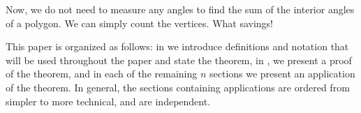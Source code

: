 Now, we do not need to measure any angles to find
the sum of  the interior angles of a polygon. We can simply
count the vertices. What savings!

This paper is organized as follows:
in  we introduce definitions and notation that will be used
throughout the paper and state the theorem,
in , we present a proof of the theorem, and in each of the remaining $n$
sections we present an application of the theorem.
In general, the sections containing applications are ordered from simpler to more technical,
and are independent.


